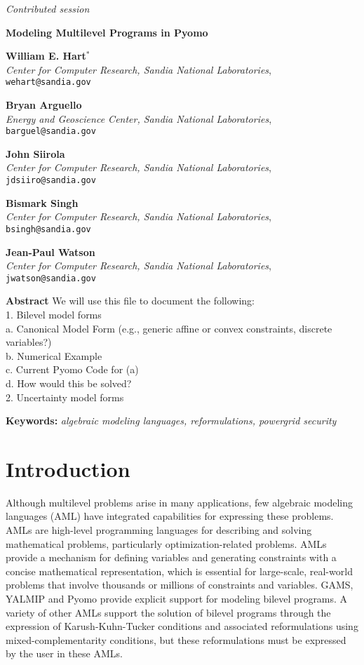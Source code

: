 \documentclass[a4paper,11pt]{article}
\newenvironment{vuoto}{}{}
\newenvironment{abst}{
\textbf{Abstract}\begin{vuoto}}{
\end{vuoto}}
\newenvironment{keyw}{
\textbf{Keywords:}\begin{vuoto}}{
\end{vuoto}}
\newcommand{\papertitle}[1]{%
\begin{center}
\LARGE \textbf{#1} \\
\vspace*{0.5cm}
}
\newcommand{\session}[1]{%
\newpage
\begin{center}
\textit{#1} \\
\end{center}
\vspace*{0.5cm}
}
\newcommand{\presentername}[1]{%
\normalsize
\textbf{#1}$^*$ \\
}
\newcommand{\presenteraffiliation}[2]{%
\normalsize \emph{#1}, \texttt{#2} \\
\vspace*{1ex} 
}
\newcommand{\coauthorname}[1]{%
\normalsize
\textbf{#1} \\
}
\newcommand{\paperabstract}[1]{%
\setcounter{figure}{0}
\end{center}
\begin{abst}
\normalsize #1
\end{abst}
\vspace*{1ex}
}
\newcommand{\paperkeywords}[1]{%
\begin{keyw}
\normalsize \emph{#1}
\end{keyw}
\vspace*{1ex}
}
\begin{document}


\session{Contributed session}
\papertitle{Modeling Multilevel Programs in Pyomo}
\presentername{William E. Hart}
\presenteraffiliation{Center for Computer Research, Sandia National Laboratories}{wehart@sandia.gov}
\coauthorname{Bryan Arguello}
\presenteraffiliation{Energy and Geoscience Center, Sandia National Laboratories}{barguel@sandia.gov}
\coauthorname{John Siirola}
\presenteraffiliation{Center for Computer Research, Sandia National Laboratories}{jdsiiro@sandia.gov}
\coauthorname{Bismark Singh}
\presenteraffiliation{Center for Computer Research, Sandia National Laboratories}{bsingh@sandia.gov}
\coauthorname{Jean-Paul Watson}
\presenteraffiliation{Center for Computer Research, Sandia National Laboratories}{jwatson@sandia.gov}


\paperabstract{
We will use this file to document the following:\\
1. Bilevel model forms\\
\indent	a. Canonical Model Form (e.g., generic affine or convex constraints, discrete variables?)\\
\indent	b. Numerical Example\\
\indent	c. Current Pyomo Code for (a)\\
\indent	d. How would this be solved?\\
2. Uncertainty model forms\\
	
}


\paperkeywords{algebraic modeling languages, reformulations, powergrid security}

\section{Introduction}

Although multilevel problems arise in many applications, few algebraic
modeling languages (AML) have integrated capabilities for expressing
these problems.  AMLs are high-level programming languages for
describing and solving mathematical problems, particularly
optimization-related problems.  AMLs provide a mechanism
for defining variables and generating constraints with a concise
mathematical representation, which is essential for large-scale,
real-world problems that involve thousands or millions of constraints
and variables.  GAMS, YALMIP and Pyomo
provide explicit support for modeling bilevel programs.  A variety
of other AMLs support the solution of bilevel programs through the
expression of Karush-Kuhn-Tucker conditions and associated
reformulations using mixed-complementarity conditions, but these
reformulations must be expressed by the user in these AMLs.
\end{document}
